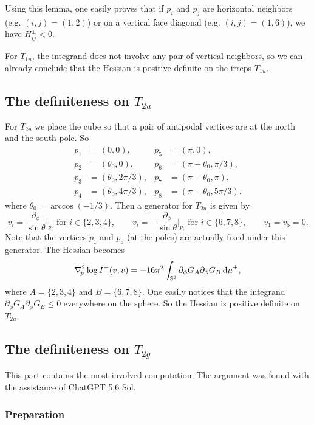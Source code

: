 \documentclass[a4paper]{amsart}
\newcommand{\uS}{\mathbb{S}}
\newcommand{\Hess}{\nabla^2}
\newcommand{\dd}{{\rm d}}
\theoremstyle{plain} %
\theoremstyle{definition} %
\theoremstyle{remark}
\begin{document}
Using this lemma, one easily proves that if $p_i$ and $p_j$ are horizontal
neighbors (e.g. $(i,j) = (1,2)$) or on a vertical face diagonal (e.g. $(i,j) =
(1,6)$), we have $H^\pm_{ij} < 0$.

For $T_{1u}$, the integrand does not involve any pair of vertical neighbors, so
we can already conclude that the Hessian is positive definite on the irreps
$T_{1u}$.

\subsection{The definiteness on \texorpdfstring{$T_{2u}$}{T2u}}

For $T_{2u}$ we place the cube so that a pair of antipodal vertices are at the
north and the south pole.  So
\begin{align*}
	p_1 &= (0, 0),&
	p_5 &= (\pi, 0),\\
	p_2 &= (\theta_0, 0),&
	p_6 &= (\pi - \theta_0, \pi/3),\\
	p_3 &= (\theta_0, 2\pi/3),&
	p_7 &= (\pi - \theta_0, \pi),\\
	p_4 &= (\theta_0, 4\pi/3),&
	p_8 &= (\pi - \theta_0, 5\pi/3).
\end{align*}
where $\theta_0 = \arccos(-1/3)$.  Then a generator for $T_{2u}$ is given by
\[
	v_i = \frac{\partial_\phi}{\sin\theta}\Big|_{p_i} \text{ for } i \in \{2, 3, 4\},\qquad
	v_i =-\frac{\partial_\phi}{\sin\theta}\Big|_{p_i} \text{ for } i \in \{6, 7, 8\},\qquad
	v_1 = v_5 = 0.
\]
Note that the vertices $p_1$ and $p_5$ (at the poles) are actually fixed under
this generator.  The Hessian becomes
\[
	\Hess_{\! p} \log I^\pm (v, v)
	= -16\pi^2 \int_{\uS^2} \partial_\phi G_A \partial_\phi G_B \, \dd \mu^\pm,
\]
where $A=\{2,3,4\}$ and $B=\{6,7,8\}$.  One easily notices that the integrand
$\partial_\phi G_A \partial_\phi G_B \le 0$ everywhere on the sphere.  So the
Hessian is positive definite on $T_{2u}$.

\subsection{The definiteness on \texorpdfstring{$T_{2g}$}{T2g}}
\label{app:T2g}

This part contains the most involved computation.  The argument was found with the assistance of ChatGPT 5.6 Sol.

\subsubsection{Preparation}
\end{document}
